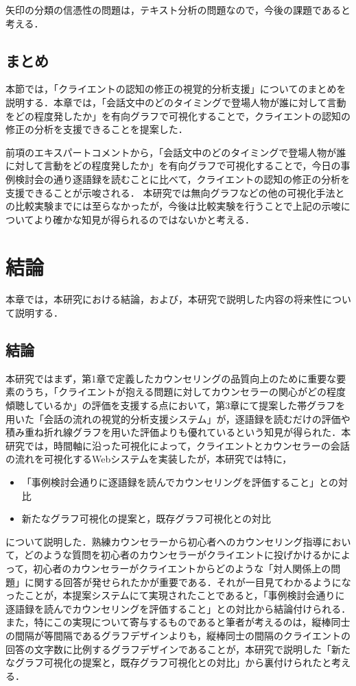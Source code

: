 \documentclass[shuuron]{kuee}
\begin{document}
矢印の分類の信憑性の問題は，テキスト分析の問題なので，今後の課題であると考える．


\section{まとめ}%
本節では，「クライエントの認知の修正の視覚的分析支援」についてのまとめを説明する．本章では，「会話文中のどのタイミングで登場人物が誰に対して言動をどの程度発したか」を有向グラフで可視化することで，クライエントの認知の修正の分析を支援できることを提案した．

前項のエキスパートコメントから，「会話文中のどのタイミングで登場人物が誰に対して言動をどの程度発したか」を有向グラフで可視化することで，今日の事例検討会の通り逐語録を読むことに比べて，クライエントの認知の修正の分析を支援できることが示唆される．
本研究では無向グラフなどの他の可視化手法との比較実験までには至らなかったが，今後は比較実験を行うことで上記の示唆についてより確かな知見が得られるのではないかと考える．


\chapter{結論}%

本章では，本研究における結論，および，本研究で説明した内容の将来性について説明する．

\section{結論}

本研究ではまず，第1章で定義したカウンセリングの品質向上のために重要な要素のうち，「クライエントが抱える問題に対してカウンセラーの関心がどの程度傾聴しているか」の評価を支援する点において，第3章にて提案した帯グラフを用いた「会話の流れの視覚的分析支援システム」が，逐語録を読むだけの評価や積み重ね折れ線グラフを用いた評価よりも優れているという知見が得られた．本研究では，時間軸に沿った可視化によって，クライエントとカウンセラーの会話の流れを可視化するWebシステムを実装したが，本研究では特に，
\begin{itemize}
  \item 「事例検討会通りに逐語録を読んでカウンセリングを評価すること」との対比

  \item 新たなグラフ可視化の提案と，既存グラフ可視化との対比
\end{itemize}
について説明した．熟練カウンセラーから初心者へのカウンセリング指導において，どのような質問を初心者のカウンセラーがクライエントに投げかけるかによって，初心者のカウンセラーがクライエントからどのような「対人関係上の問題」に関する回答が発せられたかが重要である．それが一目見てわかるようになったことが，本提案システムにて実現されたことであると，「事例検討会通りに逐語録を読んでカウンセリングを評価すること」との対比から結論付けられる．また，特にこの実現について寄与するものであると筆者が考えるのは，縦棒同士の間隔が等間隔であるグラフデザインよりも，縦棒同士の間隔のクライエントの回答の文字数に比例するグラフデザインであることが，本研究で説明した「新たなグラフ可視化の提案と，既存グラフ可視化との対比」から裏付けられたと考える．
\end{document}
